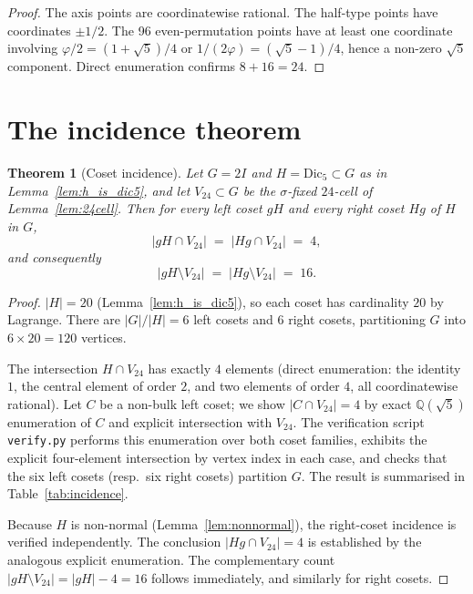 \documentclass[11pt]{article}
\newtheorem{theorem}{Theorem}[section]
\newcommand{\twoI}{2I}
\newcommand{\Dicfive}{\mathrm{Dic}_5}
\newcommand{\Vtwentyfour}{V_{24}}
\newcommand{\sigmaG}{\sigma}
\begin{document}
\begin{proof}
The axis points are coordinatewise rational. The half-type points have
coordinates $\pm 1/2$. The 96 even-permutation points have at least one
coordinate involving $\varphi/2 = (1 + \sqrt{5})/4$ or
$1/(2\varphi) = (\sqrt{5} - 1)/4$, hence a non-zero $\sqrt{5}$
component. Direct enumeration confirms $8 + 16 = 24$.
\end{proof}

\section{The incidence theorem}\label{sec:incidence}

\begin{theorem}[Coset incidence]\label{thm:main}
Let $G = \twoI$ and $H = \Dicfive \subset G$ as in
Lemma~\ref{lem:h_is_dic5}, and let $\Vtwentyfour \subset G$ be the
$\sigmaG$-fixed $24$-cell of Lemma~\ref{lem:24cell}. Then for every
left coset $gH$ and every right coset $Hg$ of $H$ in $G$,
\[
  |gH \cap \Vtwentyfour| \;=\; |Hg \cap \Vtwentyfour| \;=\; 4,
\]
and consequently
\[
  |gH \setminus \Vtwentyfour| \;=\; |Hg \setminus \Vtwentyfour| \;=\; 16.
\]
\end{theorem}

\begin{proof}
$|H| = 20$ (Lemma~\ref{lem:h_is_dic5}), so each coset has cardinality
$20$ by Lagrange. There are $|G|/|H| = 6$ left cosets and $6$ right
cosets, partitioning $G$ into $6 \times 20 = 120$ vertices.

The intersection $H \cap \Vtwentyfour$ has exactly $4$ elements
(direct enumeration: the identity $1$, the central element of order $2$,
and two elements of order $4$, all coordinatewise rational). Let $C$
be a non-bulk left coset; we show $|C \cap \Vtwentyfour| = 4$ by exact
$\mathbb{Q}(\sqrt{5})$ enumeration of $C$ and explicit intersection
with $\Vtwentyfour$. The verification script \texttt{verify.py}
performs this enumeration over both coset families, exhibits the
explicit four-element intersection by vertex index in each case, and
checks that the six left cosets (resp.\ six right cosets) partition
$G$. The result is summarised in Table~\ref{tab:incidence}.

Because $H$ is non-normal (Lemma~\ref{lem:nonnormal}), the right-coset
incidence is verified independently. The conclusion
$|Hg \cap \Vtwentyfour| = 4$ is established by the analogous explicit
enumeration. The complementary count
$|gH \setminus \Vtwentyfour| = |gH| - 4 = 16$ follows immediately, and
similarly for right cosets.
\end{proof}
\end{document}
